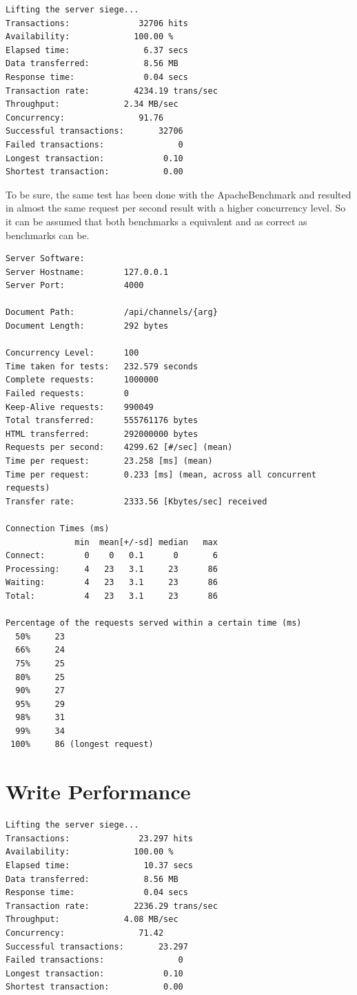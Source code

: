 \lstset{
    frame=single,
    breaklines=true,
}

\begin{lstlisting}
Lifting the server siege...
Transactions:		       32706 hits
Availability:		      100.00 %
Elapsed time:		        6.37 secs
Data transferred:	        8.56 MB
Response time:		        0.04 secs
Transaction rate:	      4234.19 trans/sec
Throughput:		        2.34 MB/sec
Concurrency:		       91.76
Successful transactions:       32706
Failed transactions:	           0
Longest transaction:	        0.10
Shortest transaction:	        0.00
\end{lstlisting}

To be sure, the same test has been done with the ApacheBenchmark and resulted in almost the same request per second result with a higher concurrency level. So it can be assumed that both benchmarks a equivalent and as correct as benchmarks can be. 

\begin{lstlisting}
Server Software:        
Server Hostname:        127.0.0.1
Server Port:            4000

Document Path:          /api/channels/{arg}
Document Length:        292 bytes

Concurrency Level:      100
Time taken for tests:   232.579 seconds
Complete requests:      1000000
Failed requests:        0
Keep-Alive requests:    990049
Total transferred:      555761176 bytes
HTML transferred:       292000000 bytes
Requests per second:    4299.62 [#/sec] (mean)
Time per request:       23.258 [ms] (mean)
Time per request:       0.233 [ms] (mean, across all concurrent requests)
Transfer rate:          2333.56 [Kbytes/sec] received

Connection Times (ms)
              min  mean[+/-sd] median   max
Connect:        0    0   0.1      0       6
Processing:     4   23   3.1     23      86
Waiting:        4   23   3.1     23      86
Total:          4   23   3.1     23      86

Percentage of the requests served within a certain time (ms)
  50%     23
  66%     24
  75%     25
  80%     25
  90%     27
  95%     29
  98%     31
  99%     34
 100%     86 (longest request)
\end{lstlisting}

\section{Write Performance}
\begin{lstlisting}
Lifting the server siege...
Transactions:		       23.297 hits
Availability:		      100.00 %
Elapsed time:		        10.37 secs
Data transferred:	        8.56 MB
Response time:		        0.04 secs
Transaction rate:	      2236.29 trans/sec
Throughput:		        4.08 MB/sec
Concurrency:		       71.42
Successful transactions:       23.297
Failed transactions:	           0
Longest transaction:	        0.10
Shortest transaction:	        0.00
\end{lstlisting}
